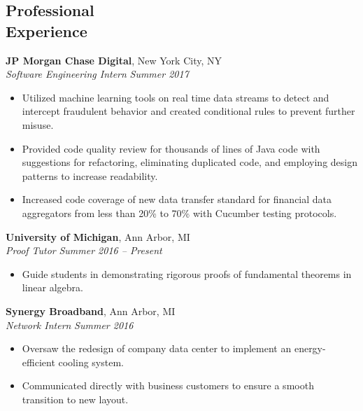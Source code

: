 \documentclass[margin,line]{resume}
\begin{document}
\begin{resume}
\sectionbreak
\vspace{-2.5mm}
    \section{\mysidestyle Professional\\Experience}

    \textbf{JP Morgan Chase Digital}, New York City, NY \\\vspace{1mm}%
    \textsl{Software Engineering Intern} \hfill \textsl{Summer 2017}
    \begin{itemize}
    \item Utilized machine learning tools on real time data streams to detect and intercept fraudulent behavior and created conditional rules to prevent further misuse. 
    \item Provided code quality review for thousands of lines of Java code with suggestions for refactoring, eliminating duplicated code, and employing design patterns to increase readability.
    \item Increased code coverage of new data transfer standard for financial data aggregators from less than 20\% to 70\% with Cucumber testing protocols.
    \end{itemize}

    \vspace{-2.5mm}
    \textbf{University of Michigan}, Ann Arbor, MI \\\vspace{1mm}%
    \textsl{Proof Tutor} \hfill \textsl{Summer 2016 -- Present}
    \begin{itemize}
    \item Guide students in demonstrating rigorous proofs of fundamental theorems in linear algebra.
    \end{itemize}

    \vspace{-2.5mm}
    \textbf{Synergy Broadband}, Ann Arbor, MI \\\vspace{1mm}%
    \textsl{Network Intern} \hfill \textsl{Summer 2016}
    \begin{itemize}
    \item Oversaw the redesign of company data center to implement an energy-efficient cooling system.
    \item Communicated directly with business customers to ensure a smooth transition to new layout. 
    \end{itemize}


\end{resume}
\end{document}
